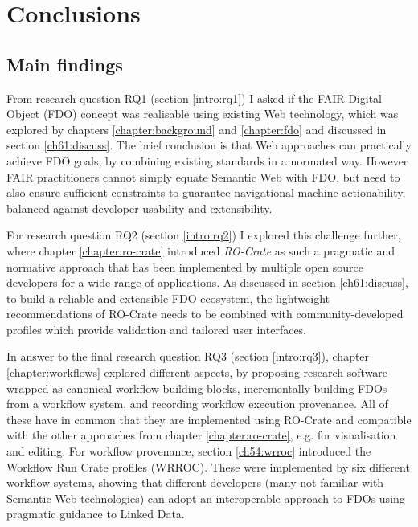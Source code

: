 \section{Conclusions}

\subsection{Main findings}

From research question RQ1 (section \vref{intro:rq1}) I asked if the FAIR Digital Object (FDO) concept was realisable using existing Web technology, which was explored by chapters \ref{chapter:background} and \ref{chapter:fdo} and discussed in section \ref{ch61:discuss}. The brief conclusion is that Web approaches can practically achieve FDO goals, by combining existing standards in a normated way. However FAIR practitioners cannot simply equate Semantic Web with FDO, but need to also ensure sufficient constraints to guarantee navigational machine-actionability, balanced against developer usability and extensibility. 

For research question RQ2 (section \vref{intro:rq2}) I explored this challenge further, where chapter \ref{chapter:ro-crate} introduced \emph{RO-Crate} as such a pragmatic and normative approach that has been implemented by multiple open source developers for a wide range of applications. As discussed in section \ref{ch61:discuss}, to build a reliable and extensible FDO ecosystem, the lightweight recommendations of RO-Crate needs to be combined with community-developed profiles which provide validation and tailored user interfaces.

In answer to the final research question RQ3 (section \vref{intro:rq3}), chapter \ref{chapter:workflows} explored different aspects, by proposing research software wrapped as canonical workflow building blocks, incrementally building FDOs from a workflow system, and recording workflow execution provenance. All of these have in common that they are implemented using RO-Crate and compatible with the other approaches from chapter \ref{chapter:ro-crate}, e.g. for visualisation and editing. For workflow provenance, section \vref{ch54:wrroc} introduced the Workflow Run Crate profiles (WRROC). These were implemented by six different workflow systems, showing that different developers (many not familiar with Semantic Web technologies) can adopt an interoperable approach to FDOs using pragmatic guidance to Linked Data. 


